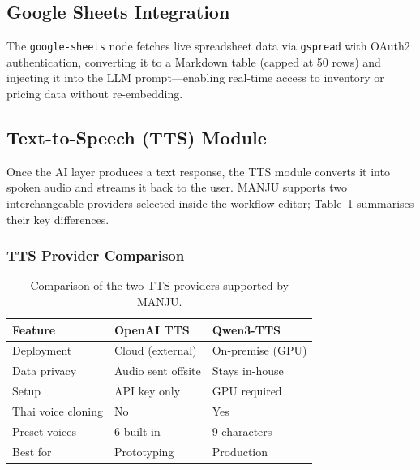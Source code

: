 \documentclass[10pt, a4paper, twocolumn]{article}
\begin{document}
\subsection{Google Sheets Integration}

The \texttt{google-sheets} node fetches live spreadsheet data via \texttt{gspread} with OAuth2 authentication, converting it to a Markdown table (capped at 50 rows) and injecting it into the LLM prompt---enabling real-time access to inventory or pricing data without re-embedding.

\subsection{Text-to-Speech (TTS) Module}
\label{sec:tts}

Once the AI layer produces a text response, the TTS module converts it
into spoken audio and streams it back to the user.
MANJU supports two interchangeable providers selected inside the workflow
editor; Table~\ref{tab:tts_options} summarises their key differences.

\subsubsection{TTS Provider Comparison}

\begin{table}[h]
    \centering
    \caption{Comparison of the two TTS providers supported by MANJU.}
    \label{tab:tts_options}
    \small
    \begin{tabular}{@{}lll@{}}
        \toprule
        \textbf{Feature} & \textbf{OpenAI TTS} & \textbf{Qwen3-TTS} \\
        \midrule
        Deployment    & Cloud (external)   & On-premise (GPU) \\
        Data privacy  & Audio sent offsite & Stays in-house \\
        Setup         & API key only       & GPU required \\
        Thai voice cloning & No            & Yes \\
        Preset voices & 6 built-in         & 9 characters \\
        Best for      & Prototyping        & Production \\
        \bottomrule
    \end{tabular}
\end{table}
\end{document}
